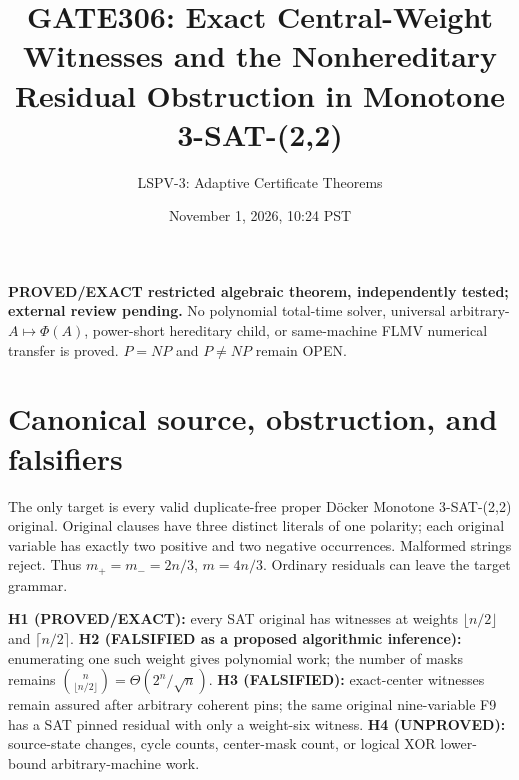 \documentclass[11pt]{article}
\title{GATE306: Exact Central-Weight Witnesses and the Nonhereditary Residual Obstruction in Monotone 3-SAT-(2,2)}
\author{LSPV-3: Adaptive Certificate Theorems}
\date{November 1, 2026, 10:24 PST}
\begin{document}
\maketitle
\noindent\textbf{PROVED/EXACT restricted algebraic theorem, independently tested; external review pending.} No polynomial total-time solver, universal arbitrary-$A\mapsto\Phi(A)$, power-short hereditary child, or same-machine FLMV numerical transfer is proved. $P=NP$ and $P\ne NP$ remain OPEN.
\section{Canonical source, obstruction, and falsifiers}
The only target is every valid duplicate-free proper D\"ocker Monotone 3-SAT-(2,2) original. Original clauses have three distinct literals of one polarity; each original variable has exactly two positive and two negative occurrences. Malformed strings reject. Thus $m_+=m_-=2n/3$, $m=4n/3$. Ordinary residuals can leave the target grammar.
\par\noindent \textbf{H1 (PROVED/EXACT):} every SAT original has witnesses at weights $\lfloor n/2\rfloor$ and $\lceil n/2\rceil$. \textbf{H2 (FALSIFIED as a proposed algorithmic inference):} enumerating one such weight gives polynomial work; the number of masks remains $\binom n{\lfloor n/2\rfloor}=\Theta(2^n/\sqrt n)$. \textbf{H3 (FALSIFIED):} exact-center witnesses remain assured after arbitrary coherent pins; the same original nine-variable F9 has a SAT pinned residual with only a weight-six witness. \textbf{H4 (UNPROVED):} source-state changes, cycle counts, center-mask count, or logical XOR lower-bound arbitrary-machine work.
\end{document}
